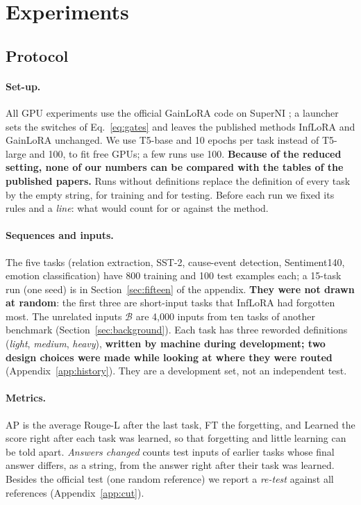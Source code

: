 \section{Experiments}
\label{sec:results}

\subsection{Protocol}
\label{sec:protocol}

\paragraph{Set-up.} All GPU experiments use the official GainLoRA code on SuperNI
\citep{wang2022superni}; a launcher sets the switches of Eq.~\eqref{eq:gates} and leaves the published
methods InfLoRA \citep{liang2024inflora} and GainLoRA \citep{liang2025gainlora} unchanged. We use T5-base
\citep{raffel2020t5} and 10 epochs per task instead of T5-large and 100, to fit free GPUs; a few runs use 100.
\textbf{Because of the reduced setting, none of our numbers can be compared with the tables of the
published papers.} Runs without definitions replace the definition of every task by the empty string,
for training and for testing. Before each run we fixed its rules and a \emph{line}: what would count
for or against the method.

\paragraph{Sequences and inputs.} The five tasks (relation extraction, SST-2, cause-event detection,
Sentiment140, emotion classification) have 800 training and 100 test examples each; a 15-task run (one
seed) is in Section~\ref{sec:fifteen} of the appendix. \textbf{They were not drawn at random}: the first
three are short-input tasks that InfLoRA had forgotten most. The unrelated inputs $\mathcal{B}$ are
4{,}000 inputs from ten tasks of another benchmark (Section~\ref{sec:background}). Each task has three
reworded definitions (\emph{light}, \emph{medium}, \emph{heavy}), \textbf{written by machine during
development; two design choices were made while looking at where they were routed}
(Appendix~\ref{app:history}). They are a development set, not an independent test.

\paragraph{Metrics.} AP is the average Rouge-L after the last task, FT the forgetting, and Learned the
score right after each task was learned, so that forgetting and little learning can be told apart.
\emph{Answers changed} counts test inputs of earlier tasks whose final answer differs, as a string,
from the answer right after their task was learned. Besides the official test (one random reference)
we report a \emph{re-test} against all references (Appendix~\ref{app:cut}).

